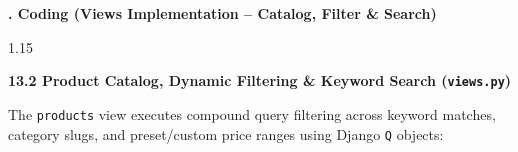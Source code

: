 \documentclass[12pt,a4paper]{article}
\begin{document}

\noindent
{\color{bcetblue}\textbf{\fontsize{14}{18}. Coding (Views Implementation -- Catalog, Filter \& Search)}}

\vspace{0.08in}

{\fontsize{13}{18}\selectfont
\begin{spacing}{1.15}

\noindent
\textbf{13.2 Product Catalog, Dynamic Filtering \& Keyword Search (\texttt{views.py})}

\vspace{0.04in}

\noindent
{\fontsize{11}{14}\selectfont The \texttt{products} view executes compound query filtering across keyword matches, category slugs, and preset/custom price ranges using Django \texttt{Q} objects:}

\end{spacing}
}

\vspace{0.06in}
\end{document}
